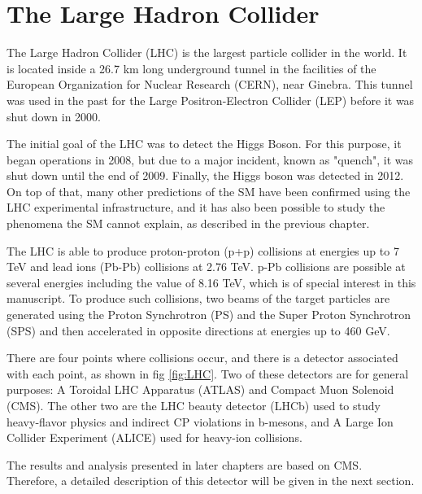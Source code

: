 \chapter{\leavevmode\newline The Large Hadron Collider}
\label{chap:chapter_2}

The Large Hadron Collider (LHC) is the largest particle collider in the world. It is located inside a 26.7 km long underground tunnel in the facilities of the European Organization for Nuclear Research (CERN), near Ginebra. This tunnel was used in the past for the Large Positron-Electron Collider (LEP) before it was shut down in 2000.

The initial goal of the LHC was to detect the Higgs Boson. For this purpose, it began operations in 2008, but due to a major incident, known as "quench", it was shut down until the end of 2009. Finally, the Higgs boson was detected in 2012. On top of that, many other predictions of the SM have been confirmed using the LHC experimental infrastructure, and it has also been possible to study the phenomena the SM cannot explain, as described in the previous chapter.

The LHC is able to produce proton-proton (p+p) collisions at energies up to 7 TeV and lead ions (Pb-Pb) collisions at 2.76 TeV. p-Pb collisions are possible at several energies \cite{vovchenko2019canonical}  including the value of 8.16 TeV, which is of special interest in this manuscript. To produce such collisions, two beams of the target particles are generated using the Proton Synchrotron (PS) and the Super Proton Synchrotron (SPS) and then accelerated in opposite directions at energies up to 460 GeV.

There are four points where collisions occur, and there is a detector associated with each point, as shown in fig \ref{fig:LHC}. Two of these detectors are for general purposes: A Toroidal LHC Apparatus (ATLAS) and Compact Muon Solenoid (CMS). The other two are the LHC beauty detector (LHCb) used to study heavy-flavor physics and indirect CP violations in b-mesons, and A Large Ion Collider Experiment (ALICE) used for heavy-ion collisions.

The results and analysis presented in later chapters are based on CMS. Therefore, a detailed description of this detector will be given in the next section.

